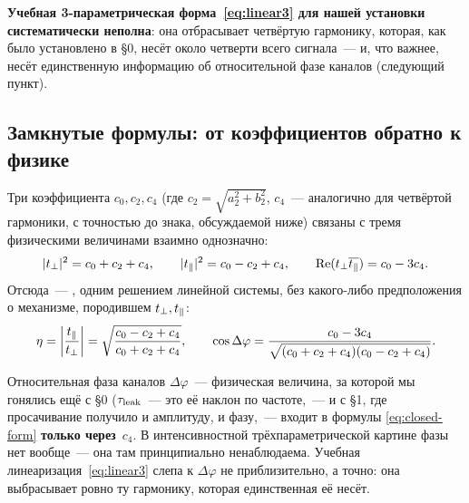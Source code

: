 \begin{tcolorbox}[enhanced,colback=cS1!7,colframe=cS1,boxrule=0pt,leftrule=3pt,arc=1pt]
\textbf{Учебная 3-параметрическая форма~\eqref{eq:linear3} для нашей установки систематически
неполна}: она отбрасывает четвёртую гармонику, которая, как было установлено в §0, несёт около
четверти всего сигнала~--- и, что важнее, несёт единственную информацию об относительной фазе
каналов (следующий пункт).
\end{tcolorbox}

\subsection{Замкнутые формулы: от коэффициентов обратно к физике}
\label{subsec:closed-form}

Три коэффициента $c_0,c_2,c_4$ (где $c_2=\sqrt{a_2^2+b_2^2}$, $c_4$~--- аналогично для четвёртой
гармоники, с точностью до знака, обсуждаемой ниже) связаны с тремя физическими величинами
взаимно однозначно:
\begin{equation}
  |t_{\perp}|^2=c_0+c_2+c_4,
  \qquad
  |t_{\parallel}|^2=c_0-c_2+c_4,
  \qquad
  \operatorname{Re}(t_{\perp}\overline{t_{\parallel}})=c_0-3c_4 .
  \label{eq:closed-form}
\end{equation}
Отсюда~--- , одним решением линейной системы, без какого-либо
предположения о механизме, породившем $t_{\perp},t_{\parallel}$:
\[
  \eta=\left|\frac{t_{\parallel}}{t_{\perp}}\right|
  =\sqrt{\frac{c_0-c_2+c_4}{c_0+c_2+c_4}},
  \qquad
  \cos\Delta\varphi=\frac{c_0-3c_4}{\sqrt{(c_0+c_2+c_4)(c_0-c_2+c_4)}} .
\]

\begin{intuition}
Относительная фаза каналов $\Delta\varphi$~--- физическая величина, за которой мы гонялись ещё с
§0 ($\tau_{\mathrm{leak}}$~--- это её наклон по частоте,~--- и с §1, где просачивание получило и амплитуду,
и фазу,~--- входит в формулы \eqref{eq:closed-form} \textbf{только через}~$c_4$. В интенсивностной
трёхпараметрической картине фазы нет вообще~--- она там принципиально ненаблюдаема. Учебная
линеаризация~\eqref{eq:linear3} слепа к $\Delta\varphi$ не приблизительно, а точно: она
выбрасывает ровно ту гармонику, которая единственная её несёт.
\end{intuition}

